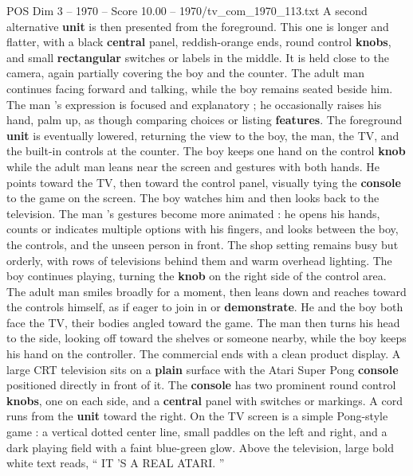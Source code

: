 \begin{textsample}{POS Dim 3 – 1970 – Score 10.00 – 1970/tv\_com\_1970\_113.txt}
A second alternative \textbf{unit} is then presented from the foreground.
This one is longer and flatter, with a black \textbf{central} panel, reddish-orange ends, round control \textbf{knobs}, and small \textbf{rectangular} switches or labels in the middle.
It is held close to the camera, again partially covering the boy and the counter.
The adult man continues facing forward and talking, while the boy remains seated beside him.
The man ’s expression is focused and explanatory ; he occasionally raises his hand, palm up, as though comparing choices or listing \textbf{features}.
The foreground \textbf{unit} is eventually lowered, returning the view to the boy, the man, the TV, and the built-in controls at the counter.
The boy keeps one hand on the control \textbf{knob} while the adult man leans near the screen and gestures with both hands.
He points toward the TV, then toward the control panel, visually tying the \textbf{console} to the game on the screen.
The boy watches him and then looks back to the television.
The man ’s gestures become more animated : he opens his hands, counts or indicates multiple options with his fingers, and looks between the boy, the controls, and the unseen person in front.
The shop setting remains busy but orderly, with rows of televisions behind them and warm overhead lighting.
The boy continues playing, turning the \textbf{knob} on the right side of the control area.
The adult man smiles broadly for a moment, then leans down and reaches toward the controls himself, as if eager to join in or \textbf{demonstrate}.
He and the boy both face the TV, their bodies angled toward the game.
The man then turns his head to the side, looking off toward the shelves or someone nearby, while the boy keeps his hand on the controller.
The commercial ends with a clean product display.
A large CRT television sits on a \textbf{plain} surface with the Atari Super Pong \textbf{console} positioned directly in front of it.
The \textbf{console} has two prominent round control \textbf{knobs}, one on each side, and a \textbf{central} panel with switches or markings.
A cord runs from the \textbf{unit} toward the right.
On the TV screen is a simple Pong-style game : a vertical dotted center line, small paddles on the left and right, and a dark playing field with a faint blue-green glow.
Above the television, large bold white text reads, “ IT ’S A REAL ATARI. ”

\end{textsample}
